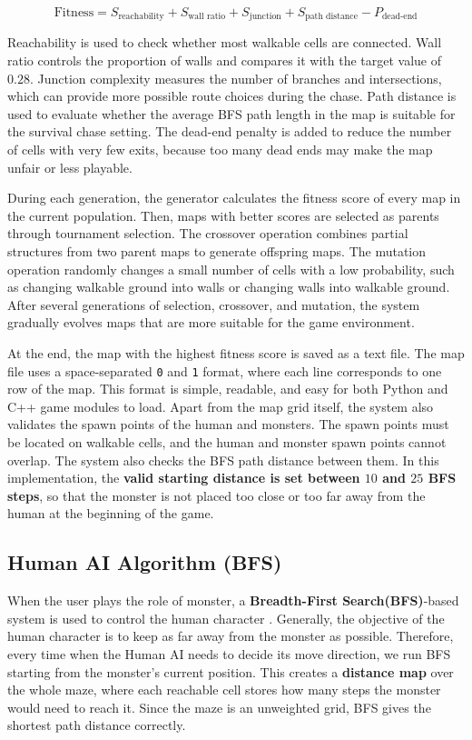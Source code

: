 \documentclass[12pt,a4paper]{article}
\begin{document}
\begin{equation}
\text{Fitness} =
S_{\text{reachability}}
+ S_{\text{wall ratio}}
+ S_{\text{junction}}
+ S_{\text{path distance}}
- P_{\text{dead-end}}
\end{equation}

Reachability is used to check whether most walkable cells are connected. Wall ratio controls the proportion of walls and compares it with the target value of $0.28$. Junction complexity measures the number of branches and intersections, which can provide more possible route choices during the chase. Path distance is used to evaluate whether the average BFS path length in the map is suitable for the survival chase setting. The dead-end penalty is added to reduce the number of cells with very few exits, because too many dead ends may make the map unfair or less playable.

During each generation, the generator calculates the fitness score of every map in the current population. Then, maps with better scores are selected as parents through tournament selection. The crossover operation combines partial structures from two parent maps to generate offspring maps. The mutation operation randomly changes a small number of cells with a low probability, such as changing walkable ground into walls or changing walls into walkable ground. After several generations of selection, crossover, and mutation, the system gradually evolves maps that are more suitable for the game environment.

At the end, the map with the highest fitness score is saved as a text file. The map file uses a space-separated \texttt{0} and \texttt{1} format, where each line corresponds to one row of the map. This format is simple, readable, and easy for both Python and C++ game modules to load. Apart from the map grid itself, the system also validates the spawn points of the human and monsters. The spawn points must be located on walkable cells, and the human and monster spawn points cannot overlap. The system also checks the BFS path distance between them. In this implementation, the \textbf{valid starting distance is set between $10$ and $25$ BFS steps}, so that the monster is not placed too close or too far away from the human at the beginning of the game.

\subsection{Human AI Algorithm (BFS)}

When the user plays the role of monster, 
a \textbf{Breadth-First Search(BFS)}-based system is used to control the human character \cite{russell2020aima}. 
Generally, the objective of the human character is to keep as far away from the monster as possible.
Therefore, every time when the Human AI needs to decide its move direction,
we run BFS starting from the monster's current position.
This creates a \textbf{distance map} over the whole maze, 
where each reachable cell stores how many steps the monster would need to reach it.
Since the maze is an unweighted grid, BFS gives the shortest path distance correctly.
\end{document}
